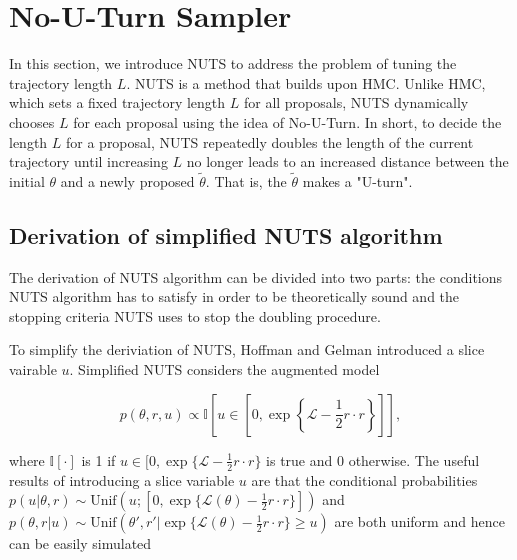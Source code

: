 \documentclass{article}
\begin{document}
\section{No-U-Turn Sampler}

In this section, we introduce NUTS to address the problem of tuning the trajectory length $L$. NUTS is a method that builds upon HMC. Unlike HMC, which sets a fixed trajectory length $L$ for all proposals, NUTS dynamically chooses $L$ for each proposal using the idea of No-U-Turn. In short, to decide the length $L$ for a proposal, NUTS repeatedly doubles the length of the current trajectory until increasing $L$ no longer leads to an increased distance between the initial $\theta$ and a newly proposed $\tilde{\theta}$. That is, the $\tilde{\theta}$ makes a "U-turn".

\subsection{Derivation of simplified NUTS algorithm}
The derivation of NUTS algorithm can be divided into two parts: the conditions NUTS algorithm has to satisfy in order to be theoretically sound and the stopping criteria NUTS uses to stop the doubling procedure.

To simplify the deriviation of NUTS, Hoffman and Gelman introduced a slice vairable $u$. Simplified NUTS considers the augmented model

$$p(\theta,r,u)\propto\mathbb{I}\left[u\in\left[0,\exp\left\{\mathcal{L}-\frac{1}{2}r\cdot r\right\}\right]\right],$$

where $\mathbb{I}[\cdot]$ is 1 if $u\in [0,\exp\{\mathcal{L}-\frac{1}{2}r\cdot r\}$ is true and 0 otherwise. The useful results of introducing a slice variable $u$ are that the conditional probabilities $p(u|\theta,r) \sim \text{Unif}(u;[0, \exp\{\mathcal{L}(\theta)-\frac{1}{2}r\cdot r\}])$ and $p(\theta,r|u) \sim \text{Unif}(\theta', r' | \exp\{\mathcal{L}(\theta)-\frac{1}{2}r\cdot r\}\geq u)$ are both uniform and hence can be easily simulated
\end{document}
